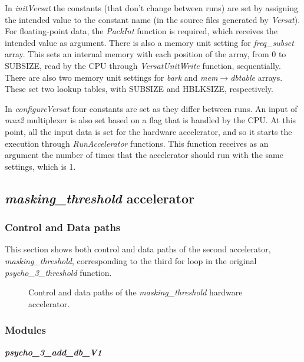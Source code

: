 In \textit{initVersat} the constants (that don't change between runs) are set by assigning the intended value to the constant name (in the source files generated by \textit{Versat}). For floating-point data, the \textit{PackInt} function is required, which receives the intended value as argument.
There is also a memory unit setting for \textit{freq\_subset} array. This sets an internal memory with each position of the array, from 0 to SUBSIZE, read by the CPU through \textit{VersatUnitWrite} function, sequentially.
There are also two memory unit settings for \textit{bark} and \textit{mem}$\rightarrow$\textit{dbtable} arrays. These set two lookup tables, with SUBSIZE and HBLKSIZE, respectively.

In \textit{configureVersat} four constants are set as they differ between runs. An input of \textit{mux2} multiplexer is also set based on a flag that is handled by the CPU.
At this point, all the input data is set for the hardware accelerator, and so it starts the execution through \textit{RunAccelerator} functions. This function receives as an argument the number of times that the accelerator should run with the same settings, which is 1.


\subsection{\textit{masking\_threshold} accelerator}

\subsubsection{Control and Data paths}
This section shows both control and data paths of the second accelerator, \textit{masking\_threshold}, corresponding to the third for loop in the original \textit{psycho\_3\_threshold} function.

\begin{figure}[H]
\centerline{}
\caption{Control and data paths of the \textit{masking\_threshold} hardware accelerator.}
\label{data2}
\end{figure}

\subsubsection{Modules}

\vspace{0.5cm}

\textbf{\textit{psycho\_3\_add\_db\_V1}}


